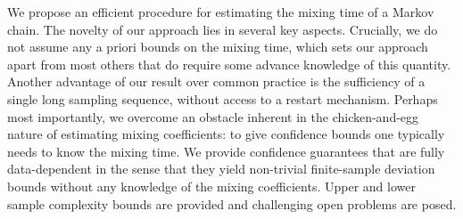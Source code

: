 We propose an efficient procedure for estimating the mixing time of a Markov chain.
The novelty of our approach lies in several key aspects.
Crucially,
we do not assume any a priori bounds
on the mixing time,
which
sets our approach apart from
most others that do
require some advance knowledge of this quantity.
Another
advantage of our result over
common practice is the sufficiency of a single long sampling sequence,
without access to a restart mechanism.
Perhaps most importantly, we overcome an obstacle inherent in the chicken-and-egg nature of
estimating mixing coefficients: to give confidence bounds one typically needs to know the mixing time.
We provide confidence guarantees that are fully data-dependent in the sense that they yield non-trivial
finite-sample deviation bounds without any knowledge of the mixing coefficients.
Upper and lower sample complexity bounds are provided and challenging open problems are posed.
